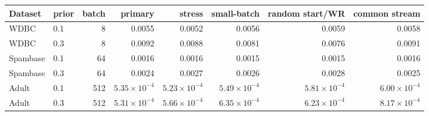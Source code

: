 \begin{tabular}{llrrrrrr}
\toprule
Dataset & prior & batch & primary & stress & small-batch & random start/WR & common stream \\
\midrule
WDBC & 0.1 & 8 & 0.0055 & 0.0052 & 0.0056 & 0.0059 & 0.0058 \\
WDBC & 0.3 & 8 & 0.0092 & 0.0088 & 0.0081 & 0.0076 & 0.0091 \\
\addlinespace
Spambase & 0.1 & 64 & 0.0016 & 0.0016 & 0.0015 & 0.0015 & 0.0016 \\
Spambase & 0.3 & 64 & 0.0024 & 0.0027 & 0.0026 & 0.0028 & 0.0025 \\
\addlinespace
Adult & 0.1 & 512 & $5.35{\times}10^{-4}$ & $5.23{\times}10^{-4}$ & $5.49{\times}10^{-4}$ & $5.81{\times}10^{-4}$ & $6.00{\times}10^{-4}$ \\
Adult & 0.3 & 512 & $5.31{\times}10^{-4}$ & $5.66{\times}10^{-4}$ & $6.35{\times}10^{-4}$ & $6.23{\times}10^{-4}$ & $8.17{\times}10^{-4}$ \\
\bottomrule
\end{tabular}
